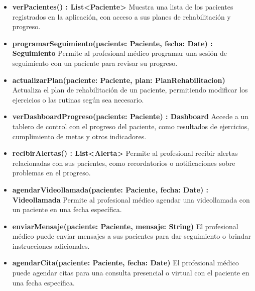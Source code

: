 \documentclass{article}
\begin{document}
\begin{itemize}
	\item \textbf{verPacientes() : List<Paciente>}  
	Muestra una lista de los pacientes registrados en la aplicación, con acceso a sus planes de rehabilitación y progreso.
	
	\item \textbf{programarSeguimiento(paciente: Paciente, fecha: Date) : Seguimiento}  
	Permite al profesional médico programar una sesión de seguimiento con un paciente para revisar su progreso.
	
	\item \textbf{actualizarPlan(paciente: Paciente, plan: PlanRehabilitacion)}  
	Actualiza el plan de rehabilitación de un paciente, permitiendo modificar los ejercicios o las rutinas según sea necesario.
	
	\item \textbf{verDashboardProgreso(paciente: Paciente) : Dashboard}  
	Accede a un tablero de control con el progreso del paciente, como resultados de ejercicios, cumplimiento de metas y otros indicadores.
	
	\item \textbf{recibirAlertas() : List<Alerta>}  
	Permite al profesional recibir alertas relacionadas con sus pacientes, como recordatorios o notificaciones sobre problemas en el progreso.
	
	\item \textbf{agendarVideollamada(paciente: Paciente, fecha: Date) : Videollamada}  
	Permite al profesional médico agendar una videollamada con un paciente en una fecha específica.
	
	\item \textbf{enviarMensaje(paciente: Paciente, mensaje: String)}  
	El profesional médico puede enviar mensajes a sus pacientes para dar seguimiento o brindar instrucciones adicionales.
	
	\item \textbf{agendarCita(paciente: Paciente, fecha: Date)}  
	El profesional médico puede agendar citas para una consulta presencial o virtual con el paciente en una fecha específica.
\end{itemize}
\end{document}
